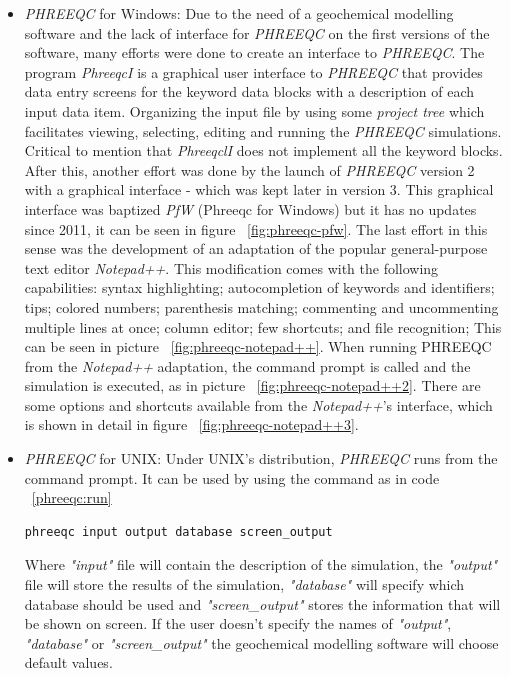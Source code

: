 \documentclass[ppgc,mestrado,English]{iiufrgs}
\begin{document}
\begin{itemize}
\item \emph{PHREEQC} for Windows: Due to the need of a geochemical modelling software and the lack of interface for \emph{PHREEQC} on the first versions of the software, many efforts were done to create an interface to \emph{PHREEQC}. The program \emph{PhreeqcI} is a graphical user interface to \emph{PHREEQC} that provides data entry screens for the keyword data blocks with a description of each input data item. Organizing the input file by using some \emph{project tree} which facilitates viewing, selecting, editing and running the \emph{PHREEQC} simulations. Critical to mention that \emph{PhreeqclI} does not implement all the keyword blocks. After this, another effort was done by the launch of \emph{PHREEQC} version 2 with a graphical interface - which was kept later in version 3. This graphical interface was baptized \emph{PfW} (Phreeqc for Windows) but it has no updates since 2011, it can be seen in figure ~\ref{fig:phreeqc-pfw}. The last effort in this sense was the development of an adaptation of the popular general-purpose text editor \emph{Notepad++}. This modification comes with the following capabilities: syntax highlighting; autocompletion of keywords and identifiers; tips; colored numbers; parenthesis matching; commenting and uncommenting multiple lines at once; column editor; few shortcuts; and file recognition; This can be seen in picture ~\ref{fig:phreeqc-notepad++}. When running PHREEQC from the \emph{Notepad++} adaptation, the command prompt is called and the simulation is executed, as in picture ~\ref{fig:phreeqc-notepad++2}. There are some options and shortcuts available from the \emph{Notepad++}'s interface, which is shown in detail in figure ~\ref{fig:phreeqc-notepad++3}.
\item \emph{PHREEQC} for UNIX: Under UNIX's distribution, \emph{PHREEQC} runs from the command prompt. It can be used by using the command as in code ~\ref{phreeqc:run}
\begin{lstlisting}[frame=single, caption=Command to run UNIX's \emph{PHREEQC}, label=phreeqc:run]
phreeqc input output database screen_output
\end{lstlisting}
Where \emph{"input"} file will contain the description of the simulation, the \emph{"output"} file will store the results of the simulation, \emph{"database"} will specify which database should be used and \emph{"screen\_output"} stores the information that will be shown on screen. If the user doesn't specify the names of \emph{"output"}, \emph{"database"} or \emph{"screen\_output"} the geochemical modelling software will choose default values.
\end{itemize}
\end{document}
